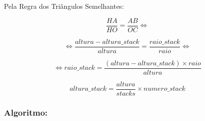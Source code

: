 \documentclass[a4paper]{article}
\begin{document}
\ttfamily

Pela Regra dos Triângulos Semelhantes:

$$ \frac{HA}{HO} = \frac{AB}{OC} \Leftrightarrow $$

\vspace{0.5cm}

$$ \Leftrightarrow \frac{altura - altura\_stack}{altura} = \frac{raio\_stack}{raio} \Leftrightarrow $$

\vspace{0.5cm}

$$ \Leftrightarrow raio\_stack = \frac{(altura - altura\_stack) \times raio}{altura} $$

\vspace{1cm}

$$ altura\_stack = \frac{altura}{stacks} \times numero\_stack $$

\newpage

\subsubsection{Algoritmo:}
\end{document}
